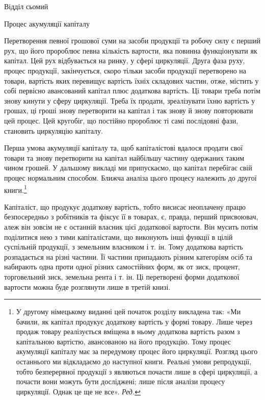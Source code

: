 Відділ сьомий

Процес акумуляції капіталу

Перетворення певної грошової суми на засоби продукції та
робочу силу є перший рух, що його пророблює певна кількість
вартости, яка повинна функціонувати як капітал. Цей рух відбувається
на ринку, у сфері циркуляції. Друга фаза руху, процес
продукції, закінчується, скоро тільки засоби продукції
перетворено на товари, вартість яких перевищує вартість їхніх
складових частин, отже, містить у собі первісно авансований
капітал плюс додаткова вартість. Ці товари треба потім знову
кинути у сферу циркуляції. Треба їх продати, зреалізувати їхню
вартість у грошах, ці гроші знову перетворити на капітал і
так знову й знову повторювати цей процес. Цей кругобіг, що
постійно пророблює ті самі послідовні фази, становить циркуляцію
капіталу.

Перша умова акумуляції капіталу та, щоб капіталістові вдалося
продати свої товари та знову перетворити на капітал найбільшу
частину одержаних таким чином грошей. У дальшому
викладі ми припускаємо, що капітал перебігає свій процес нормальним
способом. Ближча аналіза цього процесу належить до
другої книги.\footnote*{
У другому німецькому виданні цей початок розділу викладена
так: «Ми бачили, як капітал продукує додаткову вартість у формі товару.
Лише через продаж товару реалізується вміщена в ньому додаткова
вартість разом з капітальною вартістю, авансованою на його продукцію.
Тому процес акумуляції капіталу має за передумову процес його циркуляції.
Розгляд цього останнього ми відкладаємо до наступної книги.
Реальні умови репродукції, тобто безперервної продукції з являються
почасти лише в сфері циркуляції, а почасти вони можуть бути досліджені;
лише після аналізи процесу циркуляції. Однак це ще не все». \emph{Ред.}
}

Капіталіст, що продукує додаткову вартість, тобто висисає
неоплачену працю безпосередньо з робітників та фіксує її в товарах,
є, правда, перший присвоювач, алеж він зовсім не є
останній власник цієї додаткової вартости. Він мусить потім
поділитися нею з тими капіталістами, що виконують інші функції
в цілій суспільній продукції, з земельним власником і т. ін.
Тому додаткова вартість розпадається на різні частини. Її частини
припадають різним категоріям осіб та набирають одна проти
одної різних самостійних форм, як от зиск, процент, торговельний
зиск, земельна рента і т. ін. Ці перетворені форми додаткової
вартости можна буде розглянути лише в третій книзі.
